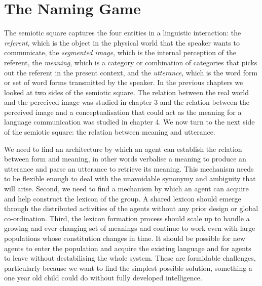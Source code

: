 \chapter{The Naming Game}
\label{chap:5}

The semiotic square captures the four entities in 
a linguistic interaction: 
the {\itshape referent}, which is the object in the physical world that the 
speaker wants to communicate, the {\itshape segmented image}, which is 
the internal perception of the referent, the {\itshape meaning}, which is a 
category or combination of categories that picks out the 
referent in the present context, and 
the {\itshape utterance}, which is the word form 
or set of word forms transmitted by the speaker. In the previous 
chapters we looked at two sides of the semiotic
square. The relation between the real world and the
perceived image was studied in chapter 3 and the relation
between the perceived image and a conceptualisation that 
could act as the meaning for a language communication was 
studied in chapter 4. We now turn to the next side of 
the semiotic square: the relation between meaning and 
utterance. 

We need to find an architecture by which 
an agent can establish the relation between form and meaning, 
in other words verbalise a meaning to produce an utterance
and parse an utterance to retrieve its meaning. This 
mechanism needs to be flexible enough to deal with the 
unavoidable synonymy and ambiguity that will arise. 
Second, we need to find a mechanism by which an agent 
can acquire and help construct the lexicon 
of the group. 
A shared lexicon should emerge
through the distributed activities of the agents without any prior
design or global co-ordination. Third, the lexicon formation 
process should scale up to handle a growing and ever
changing set of meanings and continue to work even with 
large populations whose constitution changes in time. 
It should be possible for new agents to enter the population
and acquire the existing language and for agents to 
leave without destabilising the whole system. These
are formidable challenges, particularly because we 
want to find the simplest possible solution, something 
a one year old child could do without fully 
developed intelligence. 

